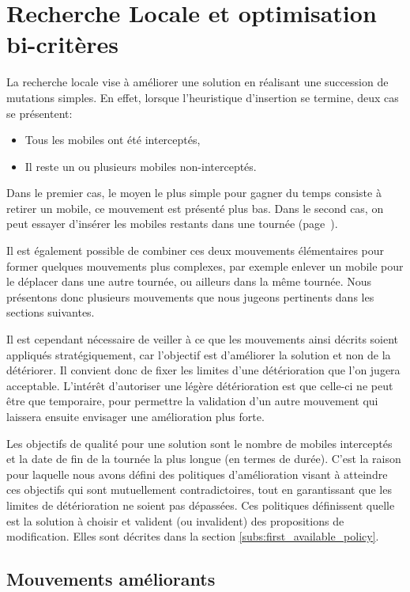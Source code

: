 	\section{Recherche Locale et optimisation bi-critères}
		La recherche locale vise à améliorer une solution en réalisant une succession de mutations simples. En effet, lorsque l'heuristique d'insertion se termine, deux cas se présentent:
		\begin{itemize}
			\item Tous les mobiles ont été interceptés,
			\item Il reste un ou plusieurs mobiles non-interceptés.
		\end{itemize}

		Dans le premier cas, le moyen le plus simple pour gagner du temps consiste à retirer un mobile, ce mouvement est présenté plus bas. Dans le second cas, on peut essayer d'insérer les mobiles restants dans une tournée (page~\pageref{subs:move_insert}).

		Il est également possible de combiner ces deux mouvements élémentaires pour former quel\-ques mouvements plus complexes, par exemple enlever un mobile pour le déplacer dans une autre tournée, ou ailleurs dans la même tournée. Nous présentons donc plusieurs mouvements que nous jugeons pertinents dans les sections suivantes.

		Il est cependant nécessaire de veiller à ce que les mouvements ainsi décrits soient appliqués stratégiquement, car l'objectif est d'améliorer la solution et non de la détériorer. Il convient donc de fixer les limites d'une détérioration que l'on jugera acceptable. L'intérêt d'autoriser une légère détérioration est que celle-ci ne peut être que temporaire, pour permettre la validation d'un autre mouvement qui laissera ensuite envisager une amélioration plus forte.

		Les objectifs de qualité pour une solution sont le nombre de mobiles interceptés et la date de fin de la tournée la plus longue (en termes de durée). C'est la raison pour laquelle nous avons défini des politiques d'amélioration visant à atteindre ces objectifs qui sont mutuellement contradictoires, tout en garantissant que les limites de détérioration ne soient pas dépassées. Ces politiques définissent quelle est la solution à choisir et valident (ou invalident) des propositions de modification. Elles sont décrites dans la section \ref{subs:first_available_policy}.

		\subsection{Mouvements améliorants}

